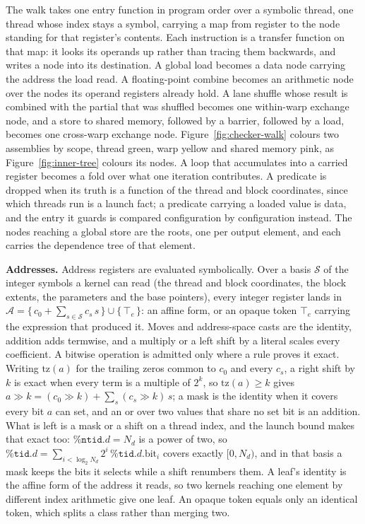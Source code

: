 \documentclass[sigplan,nonacm]{acmart}
\begin{document}
The walk takes one entry function in program order over a symbolic thread, one
thread whose index stays a symbol, carrying a map from register to the node
standing for that register's contents. Each instruction is a transfer function on that map:
it looks its operands up rather than tracing them backwards, and writes a node
into its destination. A global load becomes a data node carrying the address the
load read. A floating-point combine becomes an arithmetic node over the nodes
its operand registers already hold. A lane shuffle whose result is combined with
the partial that was shuffled becomes one within-warp exchange node, and a store to
shared memory, followed by a barrier, followed by a load, becomes one cross-warp
exchange node. Figure~\ref{fig:checker-walk} colours two assemblies by scope, thread green,
warp yellow and shared memory pink, as Figure~\ref{fig:inner-tree} colours its
nodes. A loop that
accumulates into a carried register becomes a fold over what one iteration
contributes. A predicate is dropped when its truth is a function of the thread
and block coordinates, since which threads run is a launch fact; a predicate
carrying a loaded value is data, and the entry it guards is compared
configuration by configuration instead. The nodes reaching a global store are
the roots, one per output element, and each carries the dependence tree of that
element.

\textbf{Addresses.} Address registers are evaluated symbolically. 
Over a basis $\mathcal{S}$ of the integer symbols a kernel can read
(the thread and block coordinates, the block extents, the parameters and the
base pointers), every integer register lands in
$\mathcal{A} = \{\, c_0 + \sum_{s \in \mathcal{S}} c_s\, s \,\} \cup \{\, \top_e \,\}$:
an affine form, or an opaque token $\top_e$ carrying the expression that produced
it. Moves and address-space casts are the identity, addition adds termwise, and a
multiply or a left shift by a literal scales every coefficient. A bitwise
operation is admitted only where a rule proves it exact. Writing
$\mathrm{tz}(a)$ for the trailing zeros common to $c_0$ and every $c_s$, a right
shift by $k$ is exact when every term is a multiple of $2^k$, so
$\mathrm{tz}(a) \ge k$ gives $a \gg k = (c_0 \gg k) + \sum_s (c_s \gg k)\, s$;
a mask is the identity when it covers every bit $a$ can set, and an or over two
values that share no set bit is an addition. What is left is a mask or a shift on a thread
index, and the launch bound makes that exact too: $\mathtt{\%ntid}.d = N_d$ is a
power of two, so
$\mathtt{\%tid}.d = \sum_{i < \log_2 N_d} 2^i\, \mathtt{\%tid}.d.\mathrm{bit}_i$
covers exactly $[0, N_d)$, and in that basis a mask keeps the bits it
selects while a shift renumbers them. A leaf's identity is the affine form of
the address it reads, so two kernels reaching one element by different index
arithmetic give one leaf. An opaque token equals only an identical token, which
splits a class rather than merging two.
\end{document}
